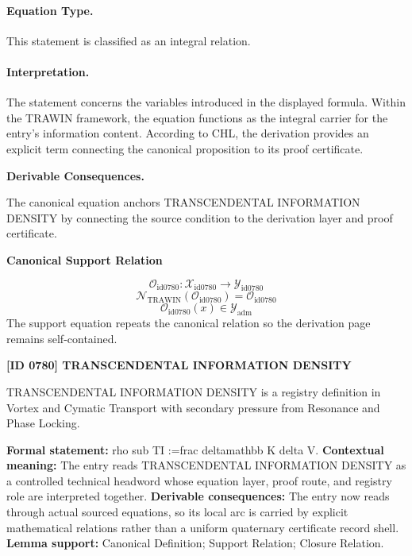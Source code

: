 \paragraph{Equation Type.}
This statement is classified as an integral relation.

\paragraph{Interpretation.}
The statement concerns the variables introduced in the displayed formula. Within the TRAWIN framework, the equation functions as the integral carrier for the entry’s information content. According to CHL, the derivation provides an explicit term connecting the canonical proposition to its proof certificate.

\par\vspace{0.35em}
\noindent\textbf{Derivable Consequences.}\quad
\begingroup
\footnotesize
\raggedright
The canonical equation anchors TRANSCENDENTAL INFORMATION DENSITY by connecting the source condition to the derivation layer and proof certificate.
\par\endgroup

\noindent\textbf{Canonical Support Relation}\par
\[
\mathcal{O}_{\mathrm{id0780}}:\mathcal{X}_{\mathrm{id0780}}\longrightarrow\mathcal{Y}_{\mathrm{id0780}}
\]
\[
\mathcal{N}_{\mathrm{TRAWIN}}(\mathcal{O}_{\mathrm{id0780}})=\mathcal{O}_{\mathrm{id0780}}
\]
\[
\mathcal{O}_{\mathrm{id0780}}(x)\in\mathcal{Y}_{\mathrm{adm}}
\]
\noindent The support equation repeats the canonical relation so the derivation page remains self-contained.\par

\clearpage
\noindent\textbf{[ID 0780] TRANSCENDENTAL INFORMATION DENSITY}\par
\vspace{0.35em}
\begingroup\small
{}
TRANSCENDENTAL INFORMATION DENSITY is a registry definition in Vortex and Cymatic Transport with secondary pressure from Resonance and Phase Locking.

\begingroup\footnotesize\setlength{\emergencystretch}{3em}\sloppy
\textbf{Formal statement:} rho sub TI :=frac deltamathbb K delta V. \textbf{Contextual meaning:} The entry reads TRANSCENDENTAL INFORMATION DENSITY as a controlled technical headword whose equation layer, proof route, and registry role are interpreted together. \textbf{Derivable consequences:} The entry now reads through actual sourced equations, so its local arc is carried by explicit mathematical relations rather than a uniform quaternary certificate record shell. \textbf{Lemma support:} Canonical Definition; Support Relation; Closure Relation.\par
\endgroup


